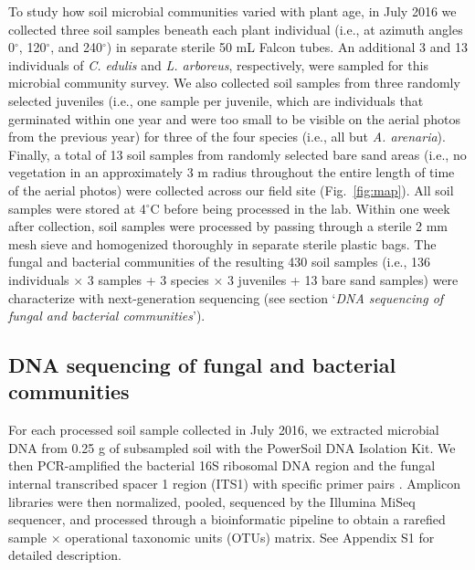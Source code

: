 To study how soil microbial communities varied with plant age, in July 2016 we collected three soil samples beneath each plant individual (i.e., at azimuth angles 0$^{\circ}$, 120$^{\circ}$, and 240$^{\circ}$) in separate sterile 50 mL Falcon tubes. 
An additional 3 and 13 individuals of \textit{C. edulis} and \textit{L. arboreus}, respectively, were sampled for this microbial community survey. We also collected soil samples from three randomly selected juveniles (i.e., one sample per juvenile, which are individuals that germinated within one year and were too small to be visible on the aerial photos from the previous year) for three of the four species (i.e., all but \textit{A. arenaria}). Finally, a total of 13 soil samples from randomly selected bare sand areas (i.e., no vegetation in an approximately 3 m radius throughout the entire length of time of the aerial photos) were collected across our field site (Fig.~\ref{fig:map}). 
All soil samples were stored at 4$^{\circ}$C before being processed in the lab. Within one week after collection, soil samples were processed by passing through a sterile 2 mm mesh sieve and homogenized thoroughly in separate sterile plastic bags.
The fungal and bacterial communities of the resulting 430 soil samples (i.e., 136 individuals $\times$ 3 samples + 3 species $\times$ 3 juveniles + 13 bare sand samples) were characterize with next-generation sequencing (see section `\textit{DNA sequencing of fungal and bacterial communities}').
\par



\subsection*{DNA sequencing of fungal and bacterial communities}
For each processed soil sample collected in July 2016, we extracted microbial DNA from 0.25 g of subsampled soil with the PowerSoil DNA Isolation Kit. We then PCR-amplified the bacterial 16S ribosomal DNA region and the fungal internal transcribed spacer 1 region (ITS1) with specific primer pairs \citep{Caporaso2012, Toju2012, Lundberg2013, Hamady2008}. Amplicon libraries were then normalized, pooled, sequenced by the Illumina MiSeq sequencer, and processed through a bioinformatic pipeline \citep{Wang2007, Edgar2011, McMurdie2013, Tanabe2013, Zhang2014, Deshpande2016, Rognes2016, Davis2018} to obtain a rarefied sample $\times$ operational taxonomic units (OTUs) matrix. See Appendix S1 for detailed description.
\par



